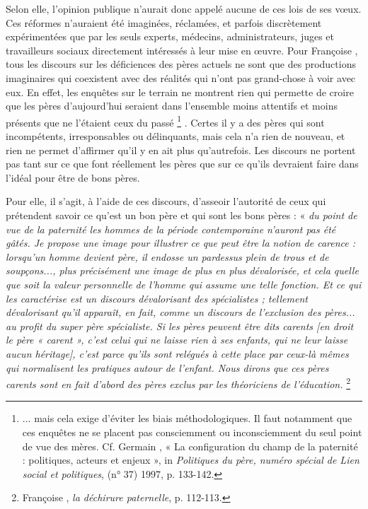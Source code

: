  Selon elle, l'opinion publique n'aurait donc appelé aucune de ces lois de ses vœux. Ces réformes n'auraient été imaginées, réclamées, et parfois discrètement expérimentées que par les seuls experts, médecins, administrateurs, juges et travailleurs sociaux directement intéressés à leur mise en œuvre. Pour Françoise , tous les discours sur les déficiences des pères actuels ne sont que des productions imaginaires qui coexistent avec des réalités qui n'ont pas grand-chose à voir avec eux. En effet, les enquêtes sur le terrain ne montrent rien qui permette de croire que les pères d'aujourd'hui seraient dans l'ensemble moins attentifs et moins présents que ne l'étaient ceux du passé%
\footnote{... mais cela exige d'éviter les biais méthodologiques. Il faut notamment que ces enquêtes ne se placent pas consciemment ou inconsciemment du seul point de vue des mères. Cf. Germain , « La configuration du champ de la paternité : politiques, acteurs et enjeux », in \emph{Politiques du père, numéro spécial de Lien social et politiques}, (n° 37) 1997, p. 133-142.}%
. Certes il y a des pères qui sont incompétents, irresponsables ou délinquants, mais cela n'a rien de nouveau, et rien ne permet d'affirmer qu'il y en ait plus qu'autrefois. Les discours ne portent pas tant sur ce que font réellement les pères que sur ce qu'ils devraient faire dans l'idéal pour être de bons pères. 

 Pour elle, il s'agit, à l'aide de ces discours, d'asseoir l'autorité de ceux qui prétendent savoir ce qu'est un bon père et qui sont les bons pères : « \emph{du point de vue de la paternité les hommes de la période contemporaine n'auront pas été gâtés. Je propose une image pour illustrer ce que peut être la notion de carence : lorsqu'un homme devient père, il endosse un pardessus plein de trous et de soupçons..., plus précisément une image de plus en plus dévalorisée, et cela quelle que soit la valeur personnelle de l'homme qui assume une telle fonction. Et ce qui les caractérise est un discours dévalorisant des spécialistes ; tellement dévalorisant qu'il apparaît, en fait, comme un discours de l'exclusion des pères... au profit du super père spécialiste. Si les pères peuvent être dits carents \emph{[en droit le père « carent », c'est celui qui ne laisse rien à ses enfants, qui ne leur laisse aucun héritage]}, c'est parce qu'ils sont relégués à cette place par ceux-là mêmes qui normalisent les pratiques autour de l'enfant. Nous dirons que ces pères carents sont en fait d'abord des pères exclus par les théoriciens de l'éducation.}%
\footnote{Françoise , \emph{la déchirure paternelle}, p. 112-113.} 

